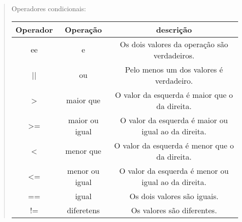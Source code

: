 \begin{quote}
Operadores condicionais:

  \begin{tabular}{ |c|c|c| }
    \hline
    Operador & Operação       & descrição                                           \\
    \hline
    ee       & e              & Os dois valores da operação são verdadeiros.        \\
    \hline
    ||       & ou             & Pelo menos um dos valores é verdadeiro.             \\
    \hline
    >        & maior que      & O valor da esquerda é maior que o da direita.       \\
    \hline
    >=       & maior ou igual & O valor da esquerda é maior ou igual ao da direita. \\
    \hline
    <        & menor que      & O valor da esquerda é menor que o da direita.       \\
    \hline
    <=       & menor ou igual & O valor da esquerda é menor ou igual ao da direita. \\
    \hline
    ==       & igual          & Os dois valores são iguais.                         \\
    \hline
    !=       & diferetens     & Os valores são diferentes.                          \\
    \hline
  \end{tabular}
\end{quote}
